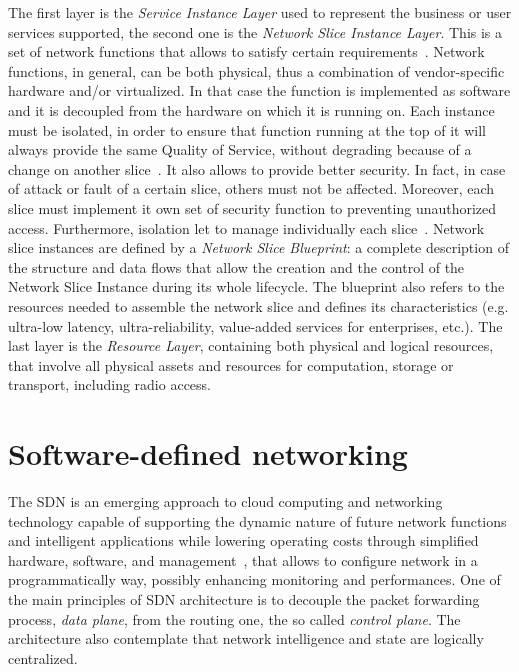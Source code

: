 The first layer is the \emph{Service Instance Layer} used to represent the
business or user services supported, the second one is the \emph{Network Slice
Instance Layer}. This is a set of network functions that allows to
satisfy certain requirements~\cite{kotulski2017end}. Network functions, in
general, can be both physical, thus a combination of vendor-specific hardware
and/or virtualized. In that case the function is implemented as software and it
is decoupled from the hardware on which it is running on. Each instance must be
isolated, in order to ensure that function running at the top of it will always
provide the same Quality of Service, without degrading because of a change on
another slice~\cite{richart2016resource}. It also allows to provide better
security. In fact, in case of attack or fault of a certain slice, others must
not be affected. Moreover, each slice must implement it own set of security
function to preventing unauthorized access. Furthermore, isolation let to
manage individually each slice~\cite{ordonez2017network}. Network slice
instances are defined by a \emph{Network Slice Blueprint}: a complete
description of the structure and data flows that allow the creation and the
control of the Network Slice Instance during its whole lifecycle. The blueprint
also refers to the resources needed to assemble the network slice and defines
its characteristics (e.g. ultra-low latency, ultra-reliability, value-added
services for enterprises, etc.). The last layer is the \emph{Resource Layer},
containing both physical and logical resources, that involve all physical
assets and resources for computation, storage or transport, including radio
access.

\section{Software-defined networking}
The SDN is an emerging approach to cloud computing and networking technology
capable of supporting the dynamic nature of future network functions and
intelligent applications while lowering operating costs through simplified
hardware, software, and management~\cite{sezer2013we}, that allows to configure
network in a programmatically way, possibly enhancing monitoring and
performances. One of the main principles of SDN architecture is to decouple the
packet forwarding process, \emph{data plane}, from the routing one, the so
called \emph{control plane}. The architecture also contemplate that network
intelligence and state are logically centralized\cite{fundation2012software}. 

